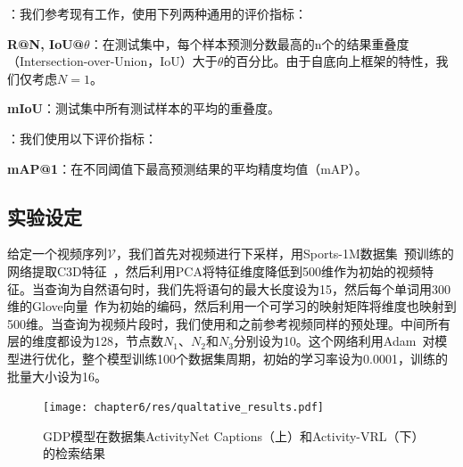 \noindent\textbf{}：我们参考现有工作，使用下列两种通用的评价指标：

\noindent\textbf{R@N, IoU@$\theta$}：在测试集中，每个样本预测分数最高的n个的结果重叠度（Intersection-over-Union，IoU）大于$\theta$的百分比。由于自底向上框架的特性，我们仅考虑$N=1$。

\noindent\textbf{mIoU}：测试集中所有测试样本的平均的重叠度。


\noindent\textbf{}：我们使用以下评价指标：

\noindent\textbf{mAP@1}：在不同阈值下最高预测结果的平均精度均值（mAP）。


\subsection{实验设定}
给定一个视频序列$\mathcal{V}$，我们首先对视频进行下采样，用Sports-1M数据集~\cite{karpathy2014large}预训练的网络提取C3D特征~\cite{tran2015learning}，然后利用PCA将特征维度降低到500维作为初始的视频特征。当查询为自然语句时，我们先将语句的最大长度设为15，然后每个单词用300维的Glove向量~\cite{pennington2014glove}作为初始的编码，然后利用一个可学习的映射矩阵将维度也映射到500维。当查询为视频片段时，我们使用和之前参考视频同样的预处理。中间所有层的维度都设为128，节点数$N_1$、$N_2$和$N_3$分别设为10。这个网络利用Adam~\cite{kingma2015adam}对模型进行优化，整个模型训练100个数据集周期，初始的学习率设为0.0001，训练的批量大小设为16。


\begin{figure}[tbp]
    \centering
    \texttt{[image: chapter6/res/qualtative\_results.pdf]}
    \caption{GDP模型在数据集ActivityNet Captions（上）和Activity-VRL（下）的检索结果}
    \label{ch6:fig:qualtative_results}
\end{figure}


